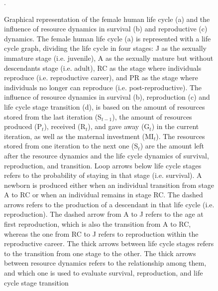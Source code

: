 \documentclass{article}
\begin{document}
\begin{figure}[H]
\caption{Graphical representation of the female human life cycle (a) and the influence of resource dynamics in survival (b) and reproductive (c) dynamics. The female human life cycle (a) is represented with a life cycle graph, dividing the life cycle in four stages: J as the sexually immature stage (i.e. juvenile), A as the sexually mature but without descendants stage (i.e. adult), RC as the stage where individuals reproduce (i.e. reproductive career), and PR as the stage where individuals no longer can reproduce (i.e. post-reproductive). The influence of resource dynamics in survival (b), reproduction (c) and life cycle stage transition (d), is based on the amount of resources stored from the last iteration (S$_{t-1}$), the amount of resources produced (P$_{t}$), received (R$_{t}$), and gave away (G$_{t}$) in the current iteration, as well as the maternal investment (MI$_{t}$). The resources stored from one iteration to the next one (S$_{t}$) are the amount left after the resource dynamics and the life cycle dynamics of survival, reproduction, and transition. Loop arrows below life cycle stages refers to the probability of staying in that stage (i.e. survival). A newborn is produced either when an individual transition from stage A to RC or when an individual remains in stage RC. The dashed arrows refers to the production of a descendant in that life cycle (i.e. reproduction). The dashed arrow from A to J refers to the age at first reproduction, which is also the transition from A to RC, whereas the one from RC to J refers to reproduction within the reproductive career. The thick arrows between life cycle stages refers to the transition from one stage to the other. The thick arrows between resource dynamics refers to the relationship among them, and which one is used to evaluate survival, reproduction, and life cycle stage transition}.
    \label{fig:1}
\end{figure}

\clearpage
\end{document}
